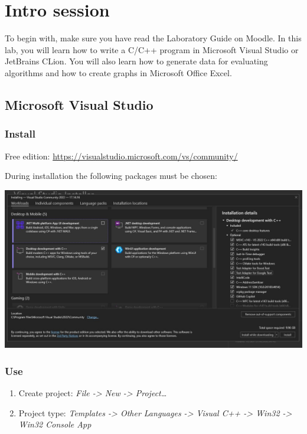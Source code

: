 \documentclass[../en-fa-lab.tex]{subfiles}
\begin{document}
\section{\texorpdfstring{\textbf{Intro session}}{Intro session}}\label{intro-session}

To begin with, make sure you have read the Laboratory Guide on
Moodle. In this lab, you will learn how to write a C/C++ program in
Microsoft Visual Studio or JetBrains CLion. You will also learn how to
generate data for evaluating algorithms and how to create graphs in
Microsoft Office
Excel.

\subsection{Microsoft Visual Studio}\label{microsoft-visual-studio}

\subsubsection{Install}\label{install}

Free edition: \url{https://visualstudio.microsoft.com/vs/community/}

During installation the following packages must be chosen:

\includegraphics[width=\textwidth]{../Resources/lab0/vs_components.JPG}

\subsubsection{Use}\label{use}

\begin{enumerate}
\def\labelenumi{\arabic{enumi}.}
\item
  Create project: \emph{File -\textgreater{} New -\textgreater{}
  Project\ldots{}}
\item
  Project type: \emph{Templates -\textgreater{} Other Languages
  -\textgreater{} Visual C++ -\textgreater{} Win32 -\textgreater{} Win32
  Console App}
\end{enumerate}
\end{document}
